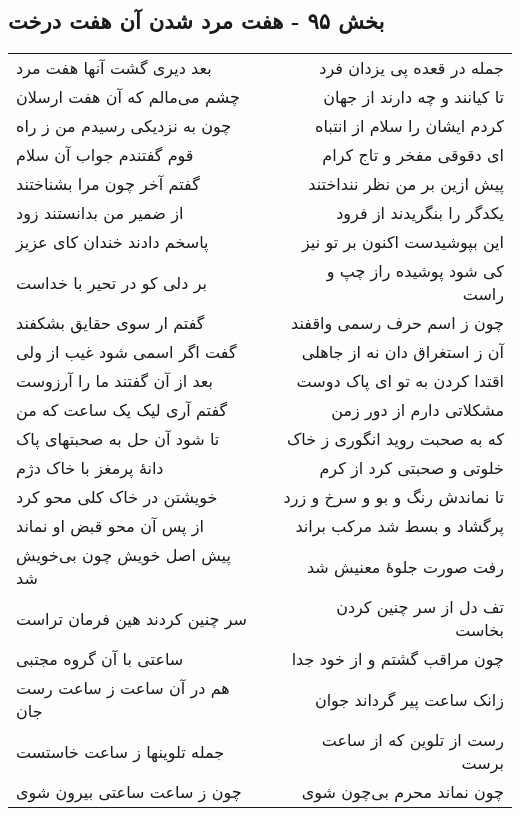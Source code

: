 \begin{center}
\section*{بخش ۹۵ - هفت مرد شدن آن هفت درخت}
\label{sec:sh095}
\begin{longtable}{l p{0.5cm} r}
بعد دیری گشت آنها هفت مرد
&&
جمله در قعده پی یزدان فرد
\\
چشم می‌مالم که آن هفت ارسلان
&&
تا کیانند و چه دارند از جهان
\\
چون به نزدیکی رسیدم من ز راه
&&
کردم ایشان را سلام از انتباه
\\
قوم گفتندم جواب آن سلام
&&
ای دقوقی مفخر و تاج کرام
\\
گفتم آخر چون مرا بشناختند
&&
پیش ازین بر من نظر ننداختند
\\
از ضمیر من بدانستند زود
&&
یکدگر را بنگریدند از فرود
\\
پاسخم دادند خندان کای عزیز
&&
این بپوشیدست اکنون بر تو نیز
\\
بر دلی کو در تحیر با خداست
&&
کی شود پوشیده راز چپ و راست
\\
گفتم ار سوی حقایق بشکفند
&&
چون ز اسم حرف رسمی واقفند
\\
گفت اگر اسمی شود غیب از ولی
&&
آن ز استغراق دان نه از جاهلی
\\
بعد از آن گفتند ما را آرزوست
&&
اقتدا کردن به تو ای پاک دوست
\\
گفتم آری لیک یک ساعت که من
&&
مشکلاتی دارم از دور زمن
\\
تا شود آن حل به صحبتهای پاک
&&
که به صحبت روید انگوری ز خاک
\\
دانهٔ پرمغز با خاک دژم
&&
خلوتی و صحبتی کرد از کرم
\\
خویشتن در خاک کلی محو کرد
&&
تا نماندش رنگ و بو و سرخ و زرد
\\
از پس آن محو قبض او نماند
&&
پرگشاد و بسط شد مرکب براند
\\
پیش اصل خویش چون بی‌خویش شد
&&
رفت صورت جلوهٔ معنیش شد
\\
سر چنین کردند هین فرمان تراست
&&
تف دل از سر چنین کردن بخاست
\\
ساعتی با آن گروه مجتبی
&&
چون مراقب گشتم و از خود جدا
\\
هم در آن ساعت ز ساعت رست جان
&&
زانک ساعت پیر گرداند جوان
\\
جمله تلوینها ز ساعت خاستست
&&
رست از تلوین که از ساعت برست
\\
چون ز ساعت ساعتی بیرون شوی
&&
چون نماند محرم بی‌چون شوی
\\

\end{longtable}
\end{center}
